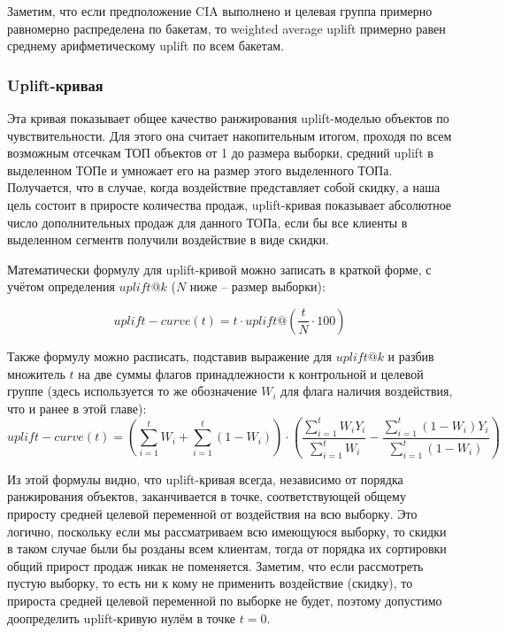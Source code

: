 Заметим, что если предположение CIA выполнено и целевая группа примерно равномерно распределена по бакетам, то weighted average uplift примерно равен среднему арифметическому uplift по всем бакетам.


\subsubsection*{Uplift-кривая}

Эта кривая показывает общее качество ранжирования uplift-моделью объектов по чувствительности. Для этого она считает накопительным итогом, проходя по всем возможным отсечкам ТОП объектов от 1 до размера выборки, средний uplift в выделенном ТОПе и умножает его на размер этого выделенного ТОПа. Получается, что в случае, когда воздействие представляет собой скидку, а наша цель состоит в приросте количества продаж, uplift-кривая показывает абсолютное число дополнительных продаж для данного ТОПа, если бы все клиенты в выделенном сегментв получили воздействие в виде скидки.

Математически формулу для uplift-кривой можно записать в краткой форме, с учётом определения $uplift@k$ ($N$ ниже -- размер выборки):

$$
    uplift-curve(t) = t \cdot uplift@ \left( \frac{t}{N} \cdot 100 \right)
$$

Также формулу можно расписать, подставив выражение для $uplift@k$ и разбив множитель $t$ на две суммы флагов принадлежности к контрольной и целевой группе (здесь используется то же обозначение $W_i$ для флага наличия воздействия, что и ранее в этой главе):
$$
    uplift-curve(t) =
        \left(
            \sum\limits_{i=1}^{t} W_i
            +
            \sum\limits_{i=1}^{t} (1 - W_i)
        \right)
        \cdot
        \left(
            \frac{
                \sum\limits_{i=1}^{t} W_i Y_i
            }{
                \sum\limits_{i=1}^{t} W_i
            }
            -
            \frac{
                \sum\limits_{i=1}^{t} (1 - W_i) Y_i
            }{
                \sum\limits_{i=1}^{t} (1 - W_i)
            }
        \right)
$$

Из этой формулы видно, что uplift-кривая всегда, независимо от порядка ранжирования объектов, заканчивается в точке, соответствующей общему приросту средней целевой переменной от воздействия на всю выборку. Это логично, поскольку если мы рассматриваем всю имеющуюся выборку, то скидки в таком случае были бы розданы всем клиентам, тогда от порядка их сортировки общий прирост продаж никак не поменяется. Заметим, что если рассмотреть пустую выборку, то есть ни к кому не применить воздействие (скидку), то прироста средней целевой переменной по выборке не будет, поэтому допустимо доопределить uplift-кривую нулём в точке $t=0$.

